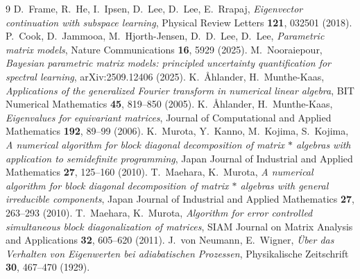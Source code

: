 \documentclass[11pt]{article}
\begin{document}
\begin{thebibliography}{9}
 D.~Frame, R.~He, I.~Ipsen, D.~Lee, D.~Lee, E.~Rrapaj,
\emph{Eigenvector continuation with subspace learning}, Physical Review Letters
\textbf{121}, 032501 (2018).
 P.~Cook, D.~Jammooa, M.~Hjorth-Jensen, D.~D.~Lee, D.~Lee,
\emph{Parametric matrix models}, Nature Communications \textbf{16}, 5929 (2025).
 M.~Nooraiepour, \emph{Bayesian parametric matrix models:
principled uncertainty quantification for spectral learning}, arXiv:2509.12406
(2025).
 K.~\AA hlander, H.~Munthe-Kaas, \emph{Applications of the
generalized Fourier transform in numerical linear algebra}, BIT Numerical
Mathematics \textbf{45}, 819--850 (2005).
 K.~\AA hlander, H.~Munthe-Kaas, \emph{Eigenvalues for
equivariant matrices}, Journal of Computational and Applied Mathematics
\textbf{192}, 89--99 (2006).
 K.~Murota, Y.~Kanno, M.~Kojima, S.~Kojima, \emph{A numerical
algorithm for block diagonal decomposition of matrix $*$ algebras with
application to semidefinite programming}, Japan Journal of Industrial and Applied
Mathematics \textbf{27}, 125--160 (2010).
 T.~Maehara, K.~Murota, \emph{A numerical algorithm for block
diagonal decomposition of matrix $*$ algebras with general irreducible
components}, Japan Journal of Industrial and Applied Mathematics \textbf{27},
263--293 (2010).
 T.~Maehara, K.~Murota, \emph{Algorithm for error controlled
simultaneous block diagonalization of matrices}, SIAM Journal on Matrix Analysis
and Applications \textbf{32}, 605--620 (2011).
 J.~von Neumann, E.~Wigner, \emph{\"Uber das Verhalten von
Eigenwerten bei adiabatischen Prozessen}, Physikalische Zeitschrift \textbf{30},
467--470 (1929).
\end{thebibliography}
\end{document}
